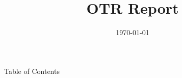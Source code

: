 \documentclass{beamer}
\title{OTR Report}
\institute{Ontario Tech Racing}
\date{\today}
\begin{document}
\begin{frame}{Table of Contents}
\label{contents}
    \tableofcontents

\end{frame}






\end{document}
